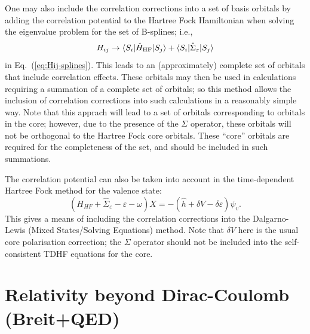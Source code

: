 \documentclass[10pt,twocolumn,a4paper]{article}%
\newcommand{\bra}[1]{\ensuremath{\langle #1|}}	%
\newcommand{\ket}[1]{\ensuremath{|#1\rangle}}	%
\newcommand{\be}{\begin{equation}}
\newcommand{\ee}{\end{equation}}
\def\en{\ensuremath{\varepsilon}}
\newcommand{\w}{\ensuremath{\omega}}
\begin{document}
One may also include the correlation corrections into a set of basis orbitals by adding the correlation potential to the Hartree Fock Hamiltonian when solving the eigenvalue problem for the set of B-splines; i.e.,
\be
H_{ij} \to \bra{S_i}\hat H_{\rm HF}\ket{S_j}  + \bra{S_i}\hat \Sigma_\en\ket{S_j} 
\ee
in Eq.~(\ref{eq:Hij-splines}).
This leads to an (approximately) complete set of orbitals that include correlation effects.
These orbitals may then be used in calculations requiring a summation of a complete set of orbitals; so this method allows the inclusion of correlation corrections into such calculations in a reasonably simple way.
Note that this apprach will lead to a set of orbitals corresponding to orbitals in the core; however, due to the presence of the $\Sigma$ operator, these orbitals will not be orthogonal to the Hartree Fock core orbitals.
These ``core'' orbitals are required for the completeness of the set, and should be included in such summations. %

The correlation potential can also be taken into account in the time-dependent Hartree Fock method for the valence state:
\be
\left( H_{HF} +\hat\Sigma_\en -  \en -\w \right)X = -\left(\hat h + \delta V - \delta \en \right)\psi_v.
\ee
This gives a means of including the correlation corrections into the Dalgarno-Lewis (Mixed States/Solving Equations) method.
Note that $\delta V$ here is the usual core polarisation correction; the $\Sigma$ operator should not be included into the self-consistent TDHF equations for the core.









\section{Relativity beyond Dirac-Coulomb (Breit+QED)}
\end{document}
